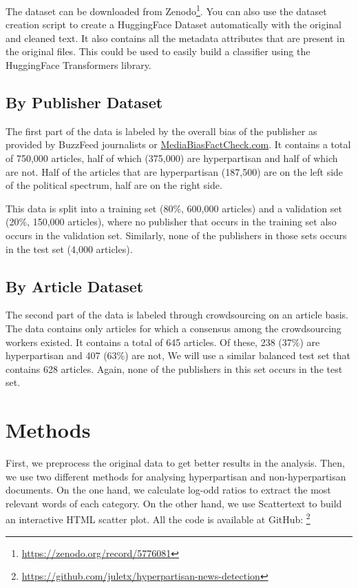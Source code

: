 \documentclass[11pt,a4paper]{article}
\begin{document}
The dataset can be downloaded from Zenodo\footnote{\url{https://zenodo.org/record/5776081}}. You can also use the dataset creation script to create a HuggingFace Dataset automatically with the original and cleaned text. It also contains all the metadata attributes that are present in the original files. This could be used to easily build a classifier using the HuggingFace Transformers library.

\subsection{By Publisher Dataset}

The first part of the data is labeled by the overall bias of the publisher as provided by BuzzFeed journalists or \href{https://mediabiasfactcheck.com}{MediaBiasFactCheck.com}. It contains a total of 750,000 articles, half of which (375,000) are hyperpartisan and half of which are not. Half of the articles that are hyperpartisan (187,500) are on the left side of the political spectrum, half are on the right side. 

This data is split into a training set (80\%, 600,000 articles) and a validation set (20\%, 150,000 articles), where no publisher that occurs in the training set also occurs in the validation set. Similarly, none of the publishers in those sets occurs in the test set (4,000 articles).

\subsection{By Article Dataset}

The second part of the data is labeled through crowdsourcing on an article basis. The data contains only articles for which a consensus among the crowdsourcing workers existed. It contains a total of 645 articles. Of these, 238 (37\%) are hyperpartisan and 407 (63\%) are not, We will use a similar balanced test set that contains 628 articles. Again, none of the publishers in this set occurs in the test set.

\section{Methods}

First, we preprocess the original data to get better results in the analysis. Then, we use two different methods for analysing hyperpartisan and non-hyperpartisan documents. On the one hand, we calculate log-odd ratios to extract the most relevant words of each category. On the other hand, we use Scattertext \cite{kessler2017scattertext} to build an interactive HTML scatter plot. All the code is available at GitHub: \footnote{\url{https://github.com/juletx/hyperpartisan-news-detection}}
\end{document}
